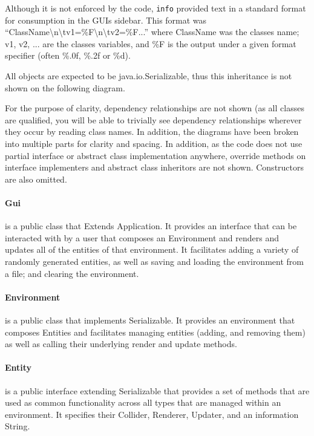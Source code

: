 Although it is not enforced by the code, \texttt{info} provided text in a standard format for consumption in the GUIs sidebar. This format was ``ClassName\textbackslash{}n\textbackslash{}tv1=\%F\textbackslash{}n\textbackslash{}tv2=\%F...'' where ClassName was the classes name; v1, v2, ... are the classes variables, and \%F is the output under a given format specifier (often \%.0f, \%.2f or \%d).

All objects are expected to be {\ttfamily java.io.Serializable}, thus this inheritance is not shown on the following diagram.

For the purpose of clarity, dependency relationships are not shown (as all classes are qualified, you will be able to trivially see dependency relationships wherever they occur by reading class names. In addition, the diagrams have been broken into multiple parts for clarity and spacing. In addition, as the code does not use partial interface or abstract class implementation anywhere, override methods on interface implementers and abstract class inheritors are not shown. Constructors are also omitted.

\paragraph{Gui} is a public class that Extends Application. It provides an interface that can be interacted with by a user that composes an Environment and renders and updates all of the entities of that environment. It facilitates adding a variety of randomly generated entities, as well as saving and loading the environment from a file; and clearing the environment.

\paragraph{Environment} is a public class that implements Serializable. It provides an environment that composes Entities and facilitates managing entities (adding, and removing them) as well as calling their underlying render and update methods.

\paragraph{Entity} is a public interface extending Serializable that provides a set of methods that are used as common functionality across all types that are managed within an environment. It specifies their Collider, Renderer, Updater, and an information String.

